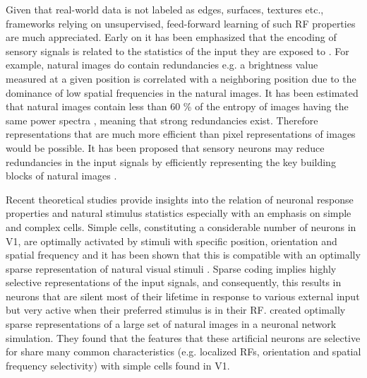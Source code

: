 Given that real-world data is not labeled as edges, surfaces, textures
etc., frameworks relying on unsupervised, feed-forward learning of such RF
properties are much appreciated. Early on it has been emphasized that the
encoding of sensory signals is related to the statistics of the input they
are exposed to \citep{barlow1953a, barlow1961b, field1987a}. For example,
natural images do contain redundancies e.g. a brightness value measured at
a given position is correlated with a neighboring position due to the
dominance of low spatial frequencies in the natural images. It has been
estimated that natural images contain less than 60 \% of the entropy of
images having the same power spectra \citep{chandler2007a}, meaning that
strong redundancies exist. Therefore representations that are much more
efficient than pixel representations of images would be possible. It has
been proposed that sensory neurons may reduce redundancies in the input
signals by efficiently representing the key building blocks of natural
images \citep{barlow1961a}. 


Recent theoretical studies provide insights into the relation of neuronal
response properties and natural stimulus statistics especially with an
emphasis on simple and complex cells. Simple cells, constituting a
considerable number of neurons in V1, are optimally activated by stimuli
with specific position, orientation and spatial frequency and it has been
shown that this is compatible with an optimally sparse representation of
natural visual stimuli \citep{field1987a, olshausen1996a}. Sparse coding
implies highly selective representations of the input signals, and
consequently, this results in neurons that are silent most of their
lifetime in response to various external input but very active when their
preferred stimulus is in their RF. \cite{olshausen1996a} created optimally
sparse representations of a large set of natural images in a neuronal
network simulation. They found that the features that these artificial
neurons are selective for share many common characteristics (e.g. localized
RFs, orientation and spatial frequency selectivity) with simple cells found
in V1.


